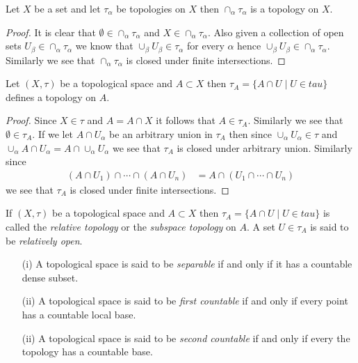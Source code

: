 \begin{prop}\label{UnionOfTopologies}Let $X$ be a set and let $\tau_\alpha$ be topologies on $X$ then $\cap_\alpha \tau_\alpha$ is a topology on $X$.
\end{prop}
\begin{proof}
It is clear that $\emptyset \in \cap_\alpha \tau_\alpha$ and $X \in \cap_\alpha \tau_\alpha$.  Also given a collection of open sets $U_\beta \in \cap_\alpha \tau_\alpha$ we know that
$\cup_\beta U_\beta \in \tau_\alpha$ for every $\alpha$ hence $\cup_\beta U_\beta \in \cap_\alpha \tau_\alpha$.  Similarly we see that $\cap_\alpha \tau_\alpha$ is closed under finite intersections.
\end{proof}

\begin{prop}\label{RelativeTopology}Let $(X, \tau)$ be a topological space and $A \subset X$ then $\tau_A = \lbrace A \cap U \mid U \in tau \rbrace$ defines a topology on $A$.
\end{prop}
\begin{proof}
Since $X \in \tau$ and $A = A \cap X$ it follows that $A \in \tau_A$.  Similarly we see that $\emptyset \in \tau_A$.  If we let $A \cap U_\alpha$ be an arbitrary union in $\tau_A$ then since $\cup_\alpha U_\alpha \in \tau$ and $\cup_\alpha A \cap U_\alpha = A \cap \cup_\alpha U_\alpha$ we see that $\tau_A$ is closed under arbitrary union.  Similarly since 
\begin{align*}
(A \cap U_1) \cap \dotsb \cap (A \cap U_n) &= A \cap (U_1 \cap \dotsb \cap U_n)
\end{align*}
we see that $\tau_A$ is closed under finite intersections.
\end{proof}

\begin{defn}If $(X, \tau)$ be a topological space and $A \subset X$ then $\tau_A = \lbrace A \cap U \mid U \in tau \rbrace$ is called the \emph{relative topology} or the \emph{subspace topology} on $A$.  A set $U \in \tau_A$ is said to be \emph{relatively open}.  
\end{defn}

\begin{defn}
\begin{itemize}
\item[(i)]A topological space is said to be \emph{separable} if and
  only if it has a countable dense subset.
\item[(ii)]A topological space is said to be \emph{first countable} if and
  only if every point has a countable local base.
\item[(ii)]A topological space is said to be \emph{second countable} if and
  only if every the topology has a countable base.
\end{itemize}
\end{defn}

